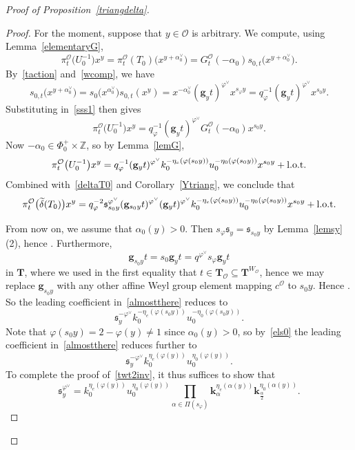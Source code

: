 \documentclass[pdftex]{sigma}
\numberwithin{equation}{section}
\begin{document}
\begin{proof}[Proof of Proposition~\ref{triangdelta}]
\begin{proof}
For the moment, suppose that $y\in\mathcal{O}$ is arbitrary. We compute, using Lemma~\ref{elementaryG},
\begin{equation}\label{sss1}
\pi_{t}^\mathcal{O}\bigl(U_0^{-1}\bigr)x^y= \pi_{t}^\mathcal{O}(T_0)\bigl(x^{y+\alpha_0^\vee}\bigr)=
G_{t}^\mathcal{O}(-\alpha_0)s_{0,t}\bigl(x^{y+\alpha_0^\vee}\bigr).
\end{equation}
By~\eqref{taction} and~\eqref{wcomp}, we have
\[
s_{0,t}\bigl(x^{y+\alpha_0^\vee}\bigr)=s_0\bigl(x^{\alpha_0^\vee}\bigr)s_{0,t}(x^y)=x^{-\alpha_0^\vee}(\mathbf{g}_yt)^{\varphi^\vee}x^{s_\varphi y}=
q_\varphi^{-1}(\mathbf{g}_yt)^{\varphi^\vee}x^{s_0y}.
\]
Substituting in~\eqref{sss1} then gives
\[
\pi_{t}^\mathcal{O}\bigl(U_0^{-1}\bigr)x^y=q_\varphi^{-1}(\mathbf{g}_yt)^{\varphi^\vee}G_{t}^\mathcal{O}(-\alpha_0)x^{s_0y}.
\]
Now $-\alpha_0\in\Phi_0^+\times\mathbb{Z}$, so by Lemma~\ref{lemG},
\begin{equation*}%
\pi_{t}^\mathcal{O}\bigl(U_0^{-1}\bigr)x^y=q_\varphi^{-1}(\mathbf{g}_yt)^{\varphi^\vee}k_0^{-\eta_e(\varphi(s_0y))}u_0^{-\eta_0(\varphi(s_0y))}x^{s_0y}+ {\rm l.o.t.}
\end{equation*}
Combined with~\eqref{deltaT0} and Corollary~\ref{Ytriang}, we conclude that
\begin{equation}\label{almostthere}
\pi_{t}^\mathcal{O}\bigl(\widetilde{\delta}(T_0)\bigr)x^y=q_\varphi^{-2}\mathfrak{s}_{s_0y}^{\varphi^\vee}(\mathbf{g}_{s_0y}t)^{\varphi^\vee}(\mathbf{g}_yt)^{\varphi^\vee}
k_0^{-\eta_e(\varphi(s_0y))}u_0^{-\eta_0(\varphi(s_0y))}x^{s_0y}+ {\rm l.o.t.}
\end{equation}

From now on, we assume that $\alpha_0(y)>0$. Then $s_\varphi\mathfrak{s}_y=\mathfrak{s}_{s_0y}$ by Lemma~\ref{lemsy}\,(2), hence
. Furthermore,
\[
\mathbf{g}_{s_0y}t=s_0\mathbf{g}_yt=q^{\varphi^\vee}s_\varphi\mathbf{g}_yt
\]
in $\mathbf{T}$, where we used in the first equality that $t\in\mathbf{T}_{\mathcal{O}}\subseteq\mathbf{T}^{W_{\mathcal{O}}}$, hence we may replace $\mathbf{g}_{s_0y}$
with any other affine Weyl group element mapping $c^\mathcal{O}$ to $s_0y$. Hence . So the leading coefficient in~\eqref{almostthere} reduces to
\[
\mathfrak{s}_y^{-\varphi^\vee}k_0^{-\eta_e(\varphi(s_0y))}u_0^{-\eta_0(\varphi(s_0y))}.
\]
Note that $\varphi(s_0y)=2-\varphi(y)\not=1$ since $\alpha_0(y)>0$, so by~\eqref{els0} the
leading coefficient in~\eqref{almostthere} reduces further to
\[
\mathfrak{s}_y^{-\varphi^\vee}k_0^{\eta_e(\varphi(y))}u_0^{\eta_0(\varphi(y))}.
\]
To complete the proof of~\eqref{twt2inv}, it thus suffices to show that
\begin{equation}\label{ldformula}
\mathfrak{s}_y^{\varphi^\vee}=k_0^{\eta_e(\varphi(y))}u_0^{\eta_0(\varphi(y))}\prod_{\alpha\in\Pi(s_\varphi)}\mathbf{k}_\alpha^{\eta_e(\alpha(y))}\mathbf{k}_{\frac{\alpha}{2}}^{\eta_0(\alpha(y))}.
\end{equation}


\end{proof}
\end{proof}
\end{document}
